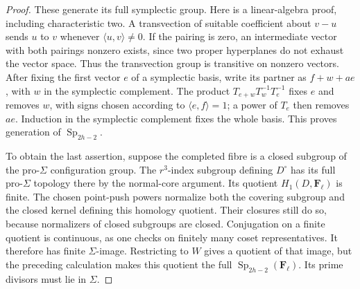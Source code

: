 \documentclass[11pt,a4paper]{article}
\newcommand{\F}{\mathbf F}
\begin{document}
\begin{proof}
These generate its full symplectic group. Here is a linear-algebra
proof, including characteristic two. A transvection of suitable
coefficient about $v-u$ sends $u$ to $v$ whenever
$\langle u,v\rangle\ne0$. If the pairing is zero, an intermediate
vector with both pairings nonzero exists, since two proper
hyperplanes do not exhaust the vector space. Thus the transvection
group is transitive on nonzero vectors. After fixing the first vector
$e$ of a symplectic basis, write its partner as $f+w+ae$, with $w$
in the symplectic complement. The product
$T_{e+w}T_w^{-1}T_e^{-1}$ fixes $e$ and removes $w$, with signs
chosen according to $\langle e,f\rangle=1$; a power of $T_e$
then removes $ae$. Induction in the symplectic complement fixes the
whole basis. This proves generation of $\operatorname{Sp}_{2h-2}$.

To obtain the last assertion, suppose the completed fibre is a
closed subgroup of the pro-$\Sigma$ configuration group. The
$r^3$-index subgroup defining $D^\circ$ has its full pro-$\Sigma$
topology there by the normal-core argument. Its quotient
$H_1(D,\F_\ell)$ is finite. The chosen point-push powers normalize
both the covering subgroup and the closed kernel defining this
homology quotient. Their closures still do so, because normalizers
of closed subgroups are closed. Conjugation on a finite quotient is
continuous, as one checks on finitely many coset representatives.
It therefore has finite $\Sigma$-image. Restricting to $W$ gives
a quotient of that image, but the preceding calculation makes this
quotient the full $\operatorname{Sp}_{2h-2}(\F_\ell)$. Its prime
divisors must lie in $\Sigma$.
\end{proof}
\end{document}

